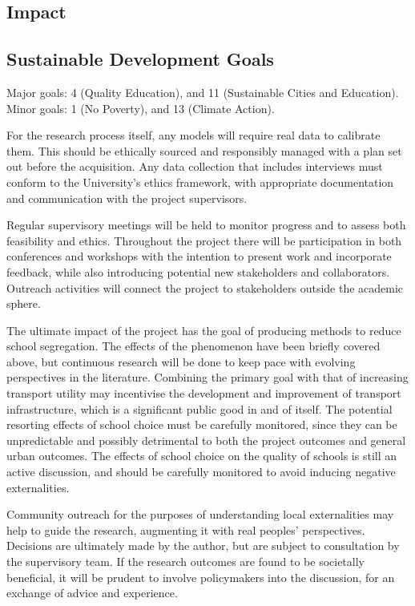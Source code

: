 \documentclass{article}
\begin{document}
\begin{multicols}{2}
\section{Impact}
\subsection{Sustainable Development Goals}
Major goals: 4 (Quality Education), and 11 (Sustainable Cities and Education).
Minor goals: 1 (No Poverty), and 13 (Climate Action).

For the research process itself, any models will require real data to calibrate them. This should be ethically sourced and responsibly managed with a plan set out before the acquisition. Any data collection that includes interviews must conform to the University's ethics framework, with appropriate documentation and communication with the project supervisors.

Regular supervisory meetings will be held to monitor progress and to assess both feasibility and ethics. Throughout the project there will be participation in both conferences and workshops with the intention to present work and incorporate feedback, while also introducing potential new stakeholders and collaborators. Outreach activities will connect the project to stakeholders outside the academic sphere.

The ultimate impact of the project has the goal of producing methods to reduce school segregation. The effects of the phenomenon have been briefly covered above, but continuous research will be done to keep pace with evolving perspectives in the literature. Combining the primary goal with that of increasing transport utility may incentivise the development and improvement of transport infrastructure, which is a significant public good in and of itself. The potential resorting effects of school choice must be carefully monitored, since they can be unpredictable and possibly detrimental to both the project outcomes and general urban outcomes. The effects of school choice on the quality of schools is still an active discussion, and should be carefully monitored to avoid inducing negative externalities.

Community outreach for the purposes of understanding local externalities may help to guide the research, augmenting it with real peoples' perspectives. Decisions are ultimately made by the author, but are subject to consultation by the supervisory team. If the research outcomes are found to be societally beneficial, it will be prudent to involve policymakers into the discussion, for an exchange of advice and experience.


\end{multicols}
\end{document}
